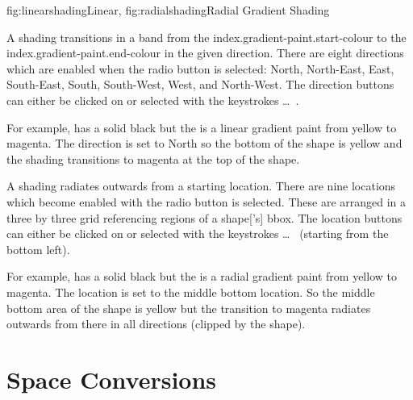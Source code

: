 {
 {fig:linearshading}{}{Linear},
 {fig:radialshading}{}{Radial}
}
{Gradient Shading}


A  shading transitions in
a band from the \gls{index.gradient-paint.start-colour} to the
\gls{index.gradient-paint.end-colour} in the given direction. There
are eight directions which are enabled when the
 radio button is selected: North, North-East,
East, South-East, South, South-West, West, and North-West.  The
direction buttons can either be clicked on or selected with the
keystrokes  \ldots\
.

For example,  has a solid black
 but the  is a linear
gradient paint from yellow to magenta. The direction is set to North
so the bottom of the shape is yellow and the shading transitions to
magenta at the top of the shape.


A  shading radiates
outwards from a starting location. There are nine locations which
become enabled with the \widget{colour.radial} radio button is
selected. These are arranged in a three by three grid referencing
regions of a \gls*{shape}['s] \gls{bbox}.
The location buttons can either be clicked on or
selected with the keystrokes  \ldots\
 (starting from the bottom left).

For example, \figureref{fig:radialshading} has a solid black
 but the  is a radial
gradient paint from yellow to magenta. The location is set to the
middle bottom location. So the middle bottom area of the \gls{shape}
is yellow but the transition to magenta radiates outwards from there
in all directions (clipped by the shape).


\section{ Space Conversions}\label{sec:convertcolspace}

